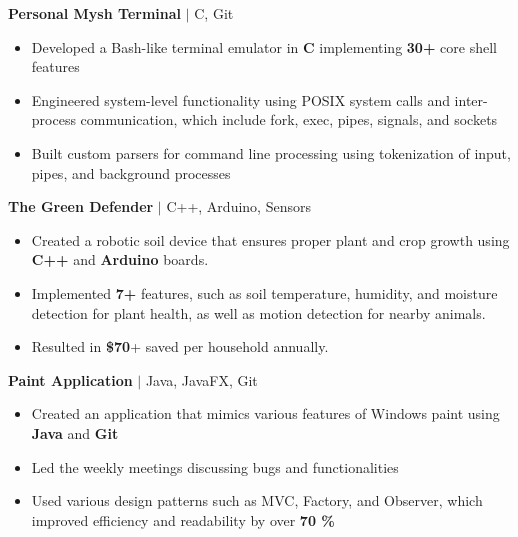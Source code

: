 \documentclass[letterpaper,10.5pt]{article}
\begin{document}
\vspace{5pt}
\noindent\textbf{Personal Mysh Terminal} $|$ C, Git
\begin{itemize}
    \setlength\itemsep{1pt}
    \item Developed a Bash-like terminal emulator in \textbf{C} implementing \textbf{30+} core shell features
    \item Engineered system-level functionality using POSIX system calls and inter-process communication, which include fork, exec, pipes, signals, and sockets 
    \item Built custom parsers for command line processing using tokenization of input, pipes, and background processes
\end{itemize}

\vspace{5pt}

\noindent\textbf{The Green Defender} $|$ C++, Arduino, Sensors
\begin{itemize}
    \setlength\itemsep{1pt}
    \item Created a robotic soil device that ensures proper plant and crop growth using \textbf{C++} and \textbf{\textbf{Arduino}} boards.
    \item Implemented \textbf{7+} features, such as soil temperature, humidity, and moisture detection for plant health, as well as motion detection for nearby animals.
    \item Resulted in \textbf{\$70}+ saved per household annually.
\end{itemize}
\vspace{5pt}
\noindent\textbf{Paint Application} $|$ Java, JavaFX, Git
\begin{itemize}
    \setlength\itemsep{1pt}
    \item Created an application that mimics various features of Windows paint using \textbf{Java} and \textbf{\textbf{Git}}
    \item Led the weekly meetings discussing bugs and functionalities
    \item Used various design patterns such as MVC, Factory, and Observer, which improved efficiency and readability by over \textbf{70 \%}
\end{itemize}
\end{document}
